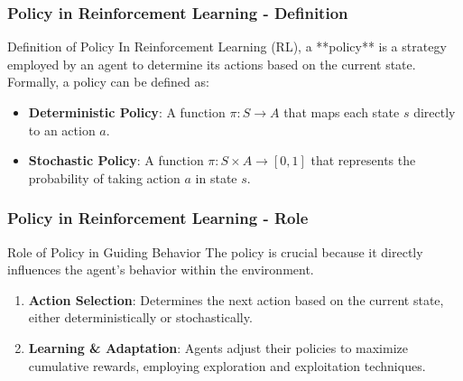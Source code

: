 \documentclass[aspectratio=169]{beamer}
\begin{document}
\begin{frame}[fragile]
    \frametitle{Policy in Reinforcement Learning - Definition}
    \begin{block}{Definition of Policy}
        In Reinforcement Learning (RL), a **policy** is a strategy employed by an agent to determine its actions based on the current state. 
        Formally, a policy can be defined as:
    \end{block}
    \begin{itemize}
        \item \textbf{Deterministic Policy}: A function \( \pi: S \rightarrow A \) that maps each state \( s \) directly to an action \( a \).
        \item \textbf{Stochastic Policy}: A function \( \pi: S \times A \rightarrow [0, 1] \) that represents the probability of taking action \( a \) in state \( s \).
    \end{itemize}
\end{frame}

\begin{frame}[fragile]
    \frametitle{Policy in Reinforcement Learning - Role}
    \begin{block}{Role of Policy in Guiding Behavior}
        The policy is crucial because it directly influences the agent's behavior within the environment.
    \end{block}
    \begin{enumerate}
        \item \textbf{Action Selection}: Determines the next action based on the current state, either deterministically or stochastically.
        \item \textbf{Learning \& Adaptation}: Agents adjust their policies to maximize cumulative rewards, employing exploration and exploitation techniques.
    \end{enumerate}
\end{frame}
\end{document}
